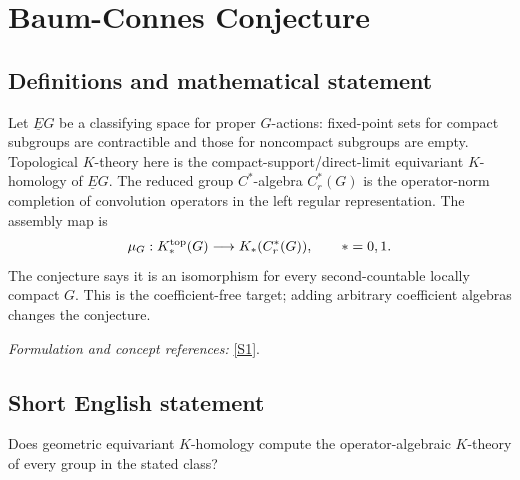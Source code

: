 \documentclass[11pt]{article}
\newcommand{\sref}[2]{\hyperlink{source:#1:#2}{[S#2]}}
\newif\ifshowcatalogue
\newcommand{\cataloguescope}[1]{\ifshowcatalogue
 \paragraph{Exact scope in the supplied catalogue.}
 \begin{quote}\small #1\end{quote}\fi}
\begin{document}
\setcounter{section}{0}
\clearpage
\section*{\texorpdfstring{Baum-Connes Conjecture}{Baum-Connes Conjecture}}\label{statement}
\subsection{Definitions and mathematical statement}
Let $\underline EG$ be a classifying space for proper $G$-actions: fixed-point sets for compact subgroups are contractible and those for noncompact subgroups are empty. Topological $K$-theory here is the compact-support/direct-limit equivariant $K$-homology of $\underline EG$. The reduced group $C^*$-algebra $C_r^*(G)$ is the operator-norm completion of convolution operators in the left regular representation. The assembly map is
\[
 \mu_G:K_*^{\rm top}(G)\longrightarrow K_*(C_r^*(G)),\qquad *=0,1.
\]
The conjecture says it is an isomorphism for every second-countable locally compact $G$. This is the coefficient-free target; adding arbitrary coefficient algebras changes the conjecture.
\par\smallskip\textit{Formulation and concept references:} \sref{statement}{1}.
\cataloguescope{Prove the Baum-Connes conjecture for every second-countable locally compact group G: the assembly map K\_top(G) \ensuremath{\to} K(C*\_r(G)) from the topological K-theory of the group, built from the classifying space for proper actions, to the K-theory of the reduced group C*-algebra is an isomorphism.}

\subsection{Short English statement}
Does geometric equivariant $K$-homology compute the operator-algebraic $K$-theory of every group in the stated class?
\end{document}
